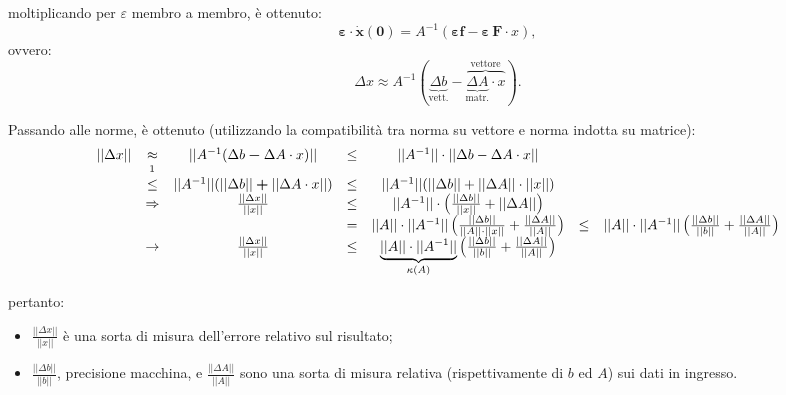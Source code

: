 moltiplicando per $\varepsilon$ membro a membro, è ottenuto:
\begin{equation}
    \boldsymbol{\varepsilon\cdot\dot x(0)} = A^{-1}(\boldsymbol{\varepsilon f} - \boldsymbol{\varepsilon\,F}\cdot x),
\end{equation}
ovvero:
\begin{equation*}
    \Delta x\approx A^{-1}(\underbrace{\Delta b}_{\text{vett.}}- \overbrace{\underbrace{\Delta A}_{\text{matr.}}\cdot x}^{\text{vettore}}).
\end{equation*}

Passando alle norme, è ottenuto (utilizzando la compatibilità tra norma su vettore e norma indotta su matrice):
\begin{equation}\label{eq:condizionamento_sistema_lineare}
    \begin{matrix}
        ||\Delta x|| &\approx& ||A^{-1}(\Delta b \boldsymbol- \Delta A\cdot x)|| &\leq& ||A^{-1}||\cdot ||\Delta b - \Delta A\cdot x||\\
        &\overset{\footnotemark}{\leq}& ||A^{-1}|| (||\Delta b||\boldsymbol + ||\Delta A\cdot x||) &\leq& ||A^{-1}|| (||\Delta b|| + ||\Delta A||\cdot ||x||)\\
        &\Rightarrow& \frac{||\Delta x||}{||x||}&\leq& ||A^{-1}|| \cdot\left(\frac{||\Delta b||}{||x||} + ||\Delta A||\right)\\
        & & &=& ||A||\cdot||A^{-1}||\left(\frac{||\Delta b||}{||A||\cdot ||x||} + \frac{||\Delta A||}{||A||}\right) &\leq& ||A||\cdot||A^{-1}||\left(\frac{||\Delta b||}{||b||} + \frac{||\Delta A||}{||A||}\right)\\
        &\rightarrow& \frac{||\Delta x||}{||x||} &\leq& \underbrace{||A||\cdot||A^{-1}||}_{\kappa(A)}\left(\frac{||\Delta b||}{||b||} + \frac{||\Delta A||}{||A||}\right)
    \end{matrix}
\end{equation}

pertanto:
\begin{itemize}
    \item $\frac{||\Delta x||}{||x||}$ è una sorta di misura dell'errore relativo sul risultato;
    \item $\frac{||\Delta b||}{||b||}$, precisione macchina, e $\frac{||\Delta A||}{||A||}$ sono una sorta di misura relativa (rispettivamente di $b$ ed $A$) sui dati in ingresso.
\end{itemize}

